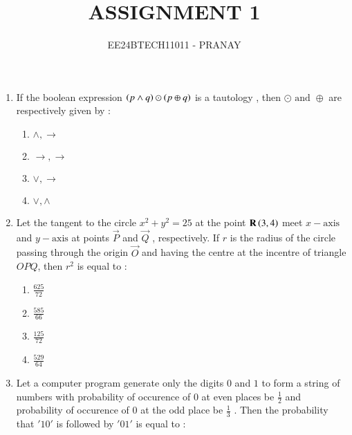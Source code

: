 \documentclass[journal,12pt,onecolumn]{IEEEtran}
\theoremstyle{remark}
\begin{document}

\vspace{3cm}

\title{ASSIGNMENT 1}
\author{EE24BTECH11011 - PRANAY}
\maketitle

\bigskip

\renewcommand{\thefigure}{\theenumi}
\renewcommand{\thetable}{\theenumi}
\begin{enumerate}
    \item If the boolean expression $\left(p \land q\right) \odot \left(p \oplus q\right)$ is a tautology , then $\odot  \text{ and }  \oplus$ are respectively given by :
    \begin{multicols}{2}
    \begin{enumerate}
        \item $\land , \rightarrow$
        \item $\rightarrow , \rightarrow$
        \item $ \lor , \rightarrow$
        \item $ \lor , \land$
    \end{enumerate}
    \end{multicols}
    \item Let the tangent to the circle $x^2 + y^2 = 25$ at the point $\mathbf{R}\left(3,4\right)$ meet $x-\text{axis}$ and $y-\text{axis}$ at points $\vec{P}$ and $\vec{Q}$ , respectively. If $r$ is the radius of the circle passing through the origin $\vec{O}$ and having the centre at the incentre of triangle $OPQ$, then $r^2$ is equal to :
    \begin{multicols}{2}
    \begin{enumerate}
        \item $\frac{625}{72}$\\
        \item $\frac{585}{66}$
        \item $\frac{125}{72}$\\
        \item $\frac{529}{64}$
    \end{enumerate}
    \end{multicols}
    \item Let a computer program generate only the digits $0$ and $1$ to form a string of numbers with probability of occurence of $0$ at even places be $\frac{1}{2}$ and probability of occurence of $0$ at the odd place be $\frac{1}{3}$ . Then the probability that $'10'$ is followed by $'01'$ is equal to :

\end{enumerate}
\end{document}
